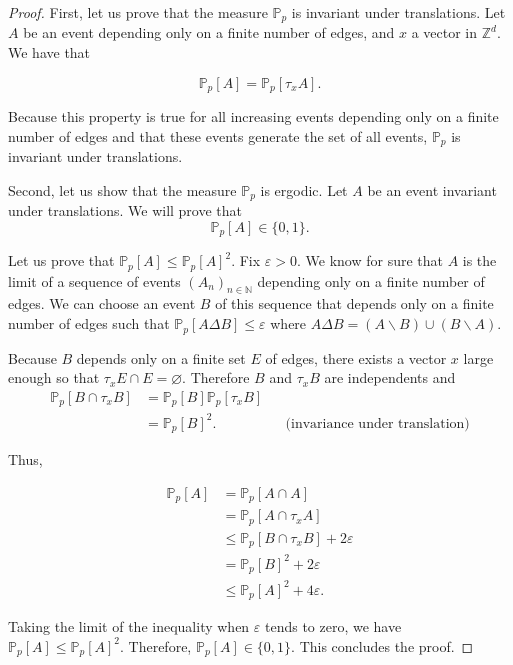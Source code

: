 \documentclass[a4paper,11pt]{article}
\theoremstyle{plain}
\theoremstyle{definition}
\theoremstyle{remark}
\begin{document}
\begin{proof}
First, let us prove that the measure $\mathbb{P}_p$ is invariant under translations. Let $A$ be an event depending only on a finite number of edges, and $x$ a vector in $\mathbb{Z}^d$.
We have that

\[\mathbb{P}_p[A] = \mathbb{P}_p[\tau_x A]. \]

Because this property is true for all increasing events depending only on a finite number of edges and that these events generate the set of all events, $\mathbb{P}_p$ is invariant under translations.

Second, let us show that the measure $\mathbb{P}_p$ is ergodic. Let $A$ be an event invariant under translations. 
We will prove that
\[ \mathbb{P}_p[A]\in \{0,1\}.\]

Let us prove that $\mathbb{P}_p[A] \leq \mathbb{P}_p[A]^2$. Fix $\varepsilon > 0$. We know for sure that $A$ is the limit of a sequence of events $(A_n)_{n \in \mathbb{N}}$ depending only on a finite number of edges. We can choose an event $B$ of this sequence that depends only on a finite number of edges such that $\mathbb{P}_p[A \Delta B] \leq \varepsilon$ where $A \Delta B = (A\backslash B) \cup (B \backslash A)$.

Because $B$ depends only on a finite set $E$ of edges, there exists a vector $x$ large enough so that $\tau_x E \cap E = \varnothing$. Therefore $B$ and $\tau_x B$ are independents and
\begin{align*}
    \mathbb{P}_p[B \cap \tau_x B] &= \mathbb{P}_p[B]\mathbb{P}_p[\tau_x B] \\
    &=\mathbb{P}_p[B]^2. && \text{(invariance under translation)}
\end{align*}

Thus,

\begin{align*}
    \mathbb{P}_p[A] &= \mathbb{P}_p[A \cap A] \\
    &= \mathbb{P}_p[A \cap \tau_x A] \\
    &\leq \mathbb{P}_p[B \cap \tau_x B] + 2\varepsilon \\
    &= \mathbb{P}_p[B]^2 + 2\varepsilon \\
    &\leq \mathbb{P}_p[A]^2 + 4\varepsilon.
\end{align*}

Taking the limit of the inequality when $\varepsilon$ tends to zero, we have
$\mathbb{P}_p[A] \leq \mathbb{P}_p[A]^2$. Therefore, $\mathbb{P}_p[A] \in \{0, 1\}$.
This concludes the proof.
\end{proof}
\end{document}
